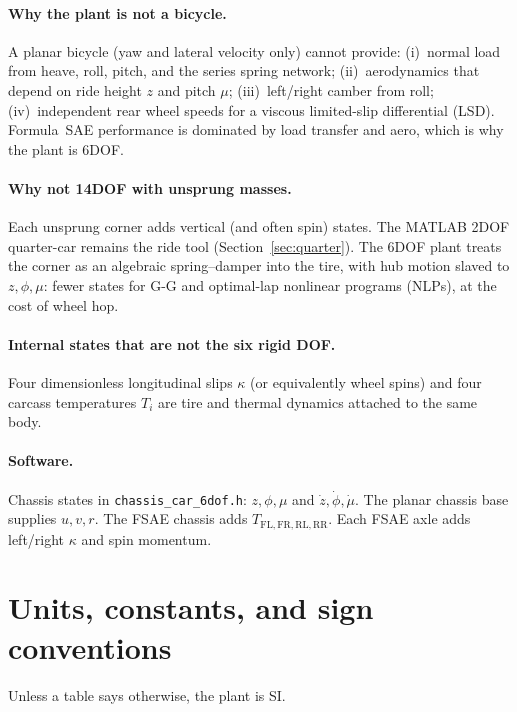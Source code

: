 \documentclass[11pt,letterpaper]{article}
\newcommand{\codepath}[1]{\paragraph{Software.} #1}
\begin{document}
\paragraph{Why the plant is not a bicycle.}
A planar bicycle (yaw and lateral velocity only) cannot provide:
(i)~normal load from heave, roll, pitch, and the series spring
network; (ii)~aerodynamics that depend on ride height $z$ and pitch
$\mu$; (iii)~left/right camber from roll; (iv)~independent rear wheel
speeds for a viscous limited-slip differential (LSD). Formula~SAE
performance is dominated by load transfer and aero, which is why the
plant is 6DOF.

\paragraph{Why not 14DOF with unsprung masses.}
Each unsprung corner adds vertical (and often spin) states. The MATLAB
2DOF quarter-car remains the ride tool (Section~\ref{sec:quarter}).
The 6DOF plant treats the corner as an algebraic spring--damper into
the tire, with hub motion slaved to $z,\phi,\mu$: fewer states for G-G
and optimal-lap nonlinear programs (NLPs), at the cost of wheel hop.

\paragraph{Internal states that are not the six rigid DOF.}
Four dimensionless longitudinal slips $\kappa$ (or equivalently wheel
spins) and four carcass temperatures $T_i$ are tire and thermal
dynamics attached to the same body.

\codepath{Chassis states in \texttt{chassis\_car\_6dof.h}: $z,\phi,\mu$
and $\dot z,\dot\phi,\dot\mu$. The planar chassis base supplies $u,v,r$.
The FSAE chassis adds $T_{\mathrm{FL,FR,RL,RR}}$. Each FSAE axle adds
left/right $\kappa$ and spin momentum.}

\section{Units, constants, and sign conventions}
\label{sec:units}

Unless a table says otherwise, the plant is SI.
\end{document}
